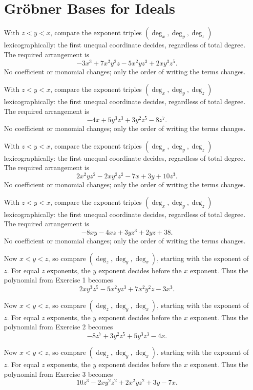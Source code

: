 \section{Gröbner Bases for Ideals}

\idea With $z<y<x$, compare the exponent triples $(\deg_x,\deg_y,\deg_z)$ lexicographically: the first unequal coordinate decides, regardless of total degree.
The required arrangement is
\[-3x^3+7x^2y^2z-5x^2yz^3+2xy^3z^5.\]
No coefficient or monomial changes; only the order of writing the terms changes.

\idea With $z<y<x$, compare the exponent triples $(\deg_x,\deg_y,\deg_z)$ lexicographically: the first unequal coordinate decides, regardless of total degree.
The required arrangement is
\[-4x+5y^3z^3+3y^2z^5-8z^7.\]
No coefficient or monomial changes; only the order of writing the terms changes.

\idea With $z<y<x$, compare the exponent triples $(\deg_x,\deg_y,\deg_z)$ lexicographically: the first unequal coordinate decides, regardless of total degree.
The required arrangement is
\[2x^2yz^2-2xy^2z^2-7x+3y+10z^3.\]
No coefficient or monomial changes; only the order of writing the terms changes.

\idea With $z<y<x$, compare the exponent triples $(\deg_x,\deg_y,\deg_z)$ lexicographically: the first unequal coordinate decides, regardless of total degree.
The required arrangement is
\[-8xy-4xz+3yz^3+2yz+38.\]
No coefficient or monomial changes; only the order of writing the terms changes.

Now $x<y<z$, so compare $(\deg_z,\deg_y,\deg_x)$, starting with the exponent of $z$. For equal $z$ exponents, the $y$ exponent decides before the $x$ exponent. Thus the polynomial from Exercise 1 becomes
\[2xy^3z^5-5x^2yz^3+7x^2y^2z-3x^3.\]

Now $x<y<z$, so compare $(\deg_z,\deg_y,\deg_x)$, starting with the exponent of $z$. For equal $z$ exponents, the $y$ exponent decides before the $x$ exponent. Thus the polynomial from Exercise 2 becomes
\[-8z^7+3y^2z^5+5y^3z^3-4x.\]

Now $x<y<z$, so compare $(\deg_z,\deg_y,\deg_x)$, starting with the exponent of $z$. For equal $z$ exponents, the $y$ exponent decides before the $x$ exponent. Thus the polynomial from Exercise 3 becomes
\[10z^3-2xy^2z^2+2x^2yz^2+3y-7x.\]

